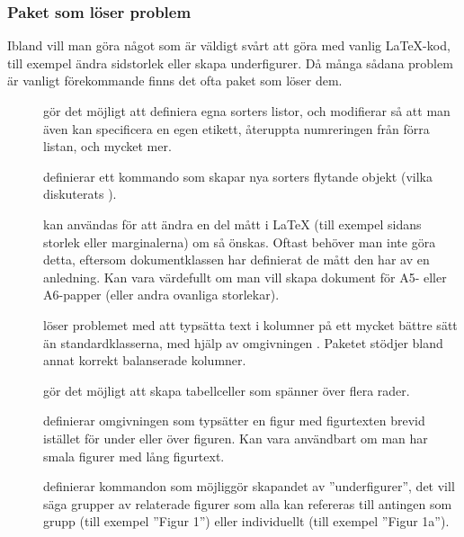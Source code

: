 \documentclass[lang=sv,ptsize=10pt,font=none,nomath,titles=bf,../../a4.tex]{subfiles}
\begin{document}
\subsubsection{Paket som löser problem}
Ibland vill man göra något som är väldigt svårt att göra med vanlig
\LaTeX-kod, till exempel ändra sidstorlek eller skapa underfigurer. Då
många sådana problem är vanligt förekommande finns det ofta paket som
löser dem.

\begin{description}
	\item[]
	gör det möjligt att definiera egna sorters listor, och modifierar 
		så att man även kan specificera en egen etikett, återuppta
	numreringen från förra listan, och mycket mer.
	
	\item[]
	definierar ett kommando  som skapar nya sorters flytande
	objekt (vilka diskuterats ).
	
	\item[]
	kan användas för att ändra en del mått i \LaTeX{} (till exempel sidans
	storlek eller marginalerna) om så önskas. Oftast behöver man inte göra
	detta, eftersom dokumentklassen har definierat de mått den har av en
	anledning. Kan vara värdefullt om man vill skapa dokument för A5-%
	eller A6-papper (eller andra ovanliga storlekar).

 	\item[]
 	löser problemet med att typsätta text i kolumner på ett mycket bättre
 	sätt än standardklasserna, med hjälp av omgivningen .
 	Paketet stödjer bland annat korrekt balanserade kolumner.
 	
	\item[]
	gör det möjligt att skapa tabellceller som spänner över flera
	rader.
	
	\item[]
	definierar omgivningen  som typsätter en figur med
	figurtexten brevid istället för under eller över figuren. Kan vara
	användbart om man har smala figurer med lång figurtext.
	
	\item[]
	definierar kommandon som möjliggör skapandet av ”underfigurer”, det
	vill säga grupper av relaterade figurer som alla kan refereras till
	antingen som grupp (till exempel ”Figur 1”) eller individuellt (till
	exempel ”Figur 1a”).
	

\end{description}
\end{document}
